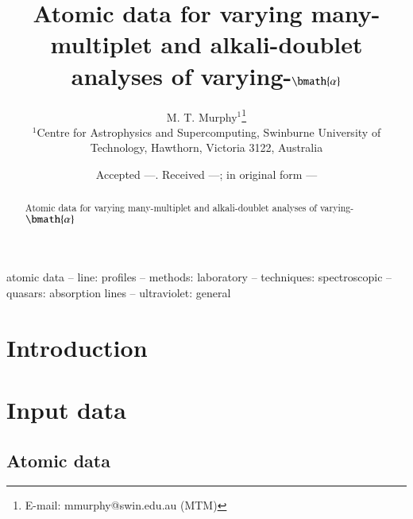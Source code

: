 \documentclass[useAMS,usenatbib]{mn2e}
\title[Atomic data for varying $\alpha$ analysis]{Atomic data for
  varying many-multiplet and alkali-doublet analyses of
  varying-$\bmath{\alpha}$}
\author[M. T. Murphy]{
  M. T. Murphy$^{1}$\thanks{E-mail: mmurphy@swin.edu.au (MTM)}\\
  $^{1}$Centre for Astrophysics and Supercomputing, Swinburne University of Technology, Hawthorn, Victoria 3122, Australia
}
\begin{document}
\date{Accepted ---. Received ---; in original form ---}

\pagerange{\pageref{firstpage}--\pageref{lastpage}} 

\maketitle

\label{firstpage}

\begin{abstract}
  Atomic data for varying many-multiplet and alkali-doublet analyses
  of varying-$\bmath{\alpha}$
\end{abstract}

\begin{keywords}
atomic data -- line: profiles -- methods: laboratory -- techniques:
spectroscopic -- quasars: absorption lines -- ultraviolet: general
\end{keywords}

\section{Introduction}\label{sec:intro}

\section{Input data}\label{sec:data}

\subsection{Atomic data}\label{ssec:atom_dat}

\newcommand\oldtabcolsep{\tabcolsep}
\setlength{\tabcolsep}{0.5em}
\end{document}
